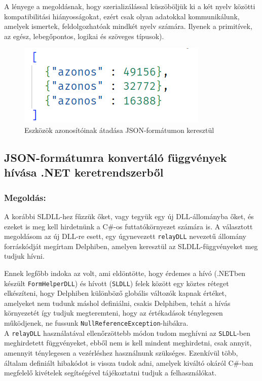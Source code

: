 \documentclass[tocnopagenum]{thesis-ekf}
\theoremstyle{definition}
\theoremstyle{remark}
\begin{document}
	A lényege a megoldásnak, hogy szerializálással küszöböljük ki a két nyelv közötti kompatibilitási hiányosságokat, ezért csak olyan adatokkal kommunikálunk, amelyek ismertek, feldolgozhatóak mindkét nyelv számára. Ilyenek a primitívek, az egész, lebegőpontos, logikai és szöveges típusok).
	\begin{figure}[h!]
		\centering
		\includegraphics[scale=0.89]{json_szerializalas_azonositok}
		\caption{Eszközök azonosítóinak átadása JSON-formátumon keresztül}
		\label{json_azonositok}
	\end{figure}
	\subsection{JSON-formátumra konvertáló függvények hívása .NET keretrendszerből}
	\subsubsection{Megoldás:} A korábbi SLDLL-hez fűzzük őket, vagy tegyük egy új DLL-állományba őket, és ezeket is meg kell hirdetnünk a C\#-os futtatókörnyezet számára is. A választott megoldásom az új DLL-re esett, egy úgynevezett \verb*|relayDLL| nevezetű állomány forráskódját megírtam Delphiben, amelyen keresztül az SLDLL-függvényeket meg tudjuk hívni.
	
	Ennek legfőbb indoka az volt, ami eldöntötte, hogy érdemes a hívó (.NETben készült \verb*|FormHelperDLL|) és hívott (\verb*|SLDLL|) felek között egy köztes réteget elkészíteni, hogy Delphiben különböző globális változók kapnak értéket, amelyeket nem tudunk máshol definiálni, csakis Delphiben, tehát a hívás környezetét így tudjuk megteremteni, hogy az értékadások ténylegesen működjenek, ne fussunk \verb*|NullReferenceException|-hibákra.\\

	A \verb*|relayDLL| használatával ellenőrzöttebb módon tudom meghívni az \verb*|SLDLL|-ben meghirdetett függvényeket, ebből nem is kell mindent meghirdetni, csak annyit, amennyit ténylegesen a vezérléshez használnunk szükséges. Ezenkívül több, általam definiált hibakódot is vissza tudok adni, amelyek kiváltó okáról C\#-ban megfelelő kivételek segítségével tájékoztatni tudjuk a felhasználókat.
\end{document}

